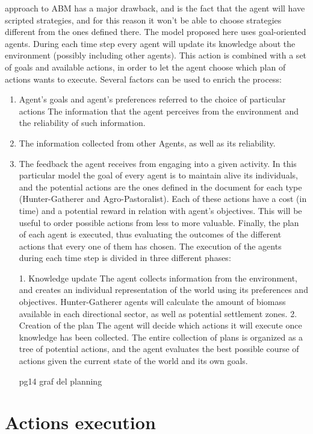 \begin{enumerate}
\begin{enumerate}
\begin{enumeration}
\begin{enumerate}
\begin{enumerate}
\begin{enumerate}
\begin{enumerate}
approach to ABM has a major drawback, and is the fact that the agent will have scripted strategies,
and for this reason it won't be able to choose strategies different from the ones defined there.
The model proposed here uses goal-oriented agents. During each time step every agent will update its
knowledge about the environment (possibly including other agents). This action is combined with a set
of goals and available actions, in order to let the agent choose which plan of actions wants to execute.
Several factors can be used to enrich the process:

\begin{enumerate}
\item Agent's goals and agent's preferences referred to the choice of particular actions
\itme The information that the agent perceives from the environment and the reliability of such
information.
\item The information collected from other Agents, as well as its reliability.
\item The feedback the agent receives from engaging into a given activity.
In this particular model the goal of every agent is to maintain alive its individuals, and the potential
actions are the ones defined in the document for each type (Hunter-Gatherer and Agro-Pastoralist).
Each of these actions have a cost (in time) and a potential reward in relation with agent's objectives.
This will be useful to order possible actions from less to more valuable. Finally, the plan of each agent
is executed, thus evaluating the outcomes of the different actions that every one of them has chosen.
The execution of the agents during each time step is divided in three different phases:

1. Knowledge update
The agent collects information from the environment, and creates an individual representation of the
world using its preferences and objectives. Hunter-Gatherer agents will calculate the amount of
biomass available in each directional sector, as well as potential settlement zones.
2. Creation of the plan
The agent will decide which actions it will execute once knowledge has been collected. The entire
collection of plans is organized as a tree of potential actions, and the agent evaluates the best
possible course of actions given the current state of the world and its own goals.

pg14 graf del planning
\end{enumerate}

\section{Actions execution}


\end{enumerate}
\end{enumerate}
\end{enumerate}
\end{enumerate}
\end{enumeration}
\end{enumerate}
\end{enumerate}
